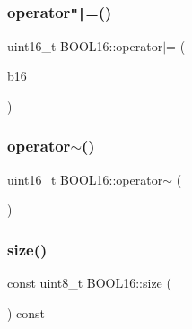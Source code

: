 \hypertarget{struct_b_o_o_l16_ae46b5a9f5d39a7e0fdca2c356228e94a}{}\label{struct_b_o_o_l16_ae46b5a9f5d39a7e0fdca2c356228e94a} 
\subsubsection{\texorpdfstring{operator\texttt{"|}=()}{operator|=()}\hspace{0.1cm}{\footnotesize\ttfamily [2/2]}}
{\footnotesize\ttfamily uint16\+\_\+t B\+O\+O\+L16\+::operator$\vert$= (\begin{DoxyParamCaption}\item[{const \hyperlink{struct_b_o_o_l16}{B\+O\+O\+L16}}]{b16 }\end{DoxyParamCaption})\hspace{0.3cm}{\ttfamily [inline]}}

\hypertarget{struct_b_o_o_l16_aaaacdec648453265e0f77458848bea53}{}\label{struct_b_o_o_l16_aaaacdec648453265e0f77458848bea53} 
\subsubsection{\texorpdfstring{operator$\sim$()}{operator~()}}
{\footnotesize\ttfamily uint16\+\_\+t B\+O\+O\+L16\+::operator$\sim$ (\begin{DoxyParamCaption}\item[{void}]{ }\end{DoxyParamCaption})\hspace{0.3cm}{\ttfamily [inline]}}

\hypertarget{struct_b_o_o_l16_af16f1167b6a21040e6a658b9e3bf58a8}{}\label{struct_b_o_o_l16_af16f1167b6a21040e6a658b9e3bf58a8} 
\subsubsection{\texorpdfstring{size()}{size()}}
{\footnotesize\ttfamily const uint8\+\_\+t B\+O\+O\+L16\+::size (\begin{DoxyParamCaption}{ }\end{DoxyParamCaption}) const\hspace{0.3cm}{\ttfamily [inline]}}



